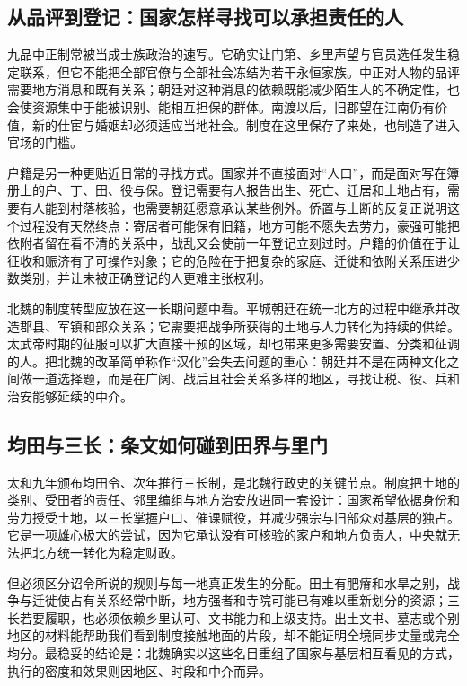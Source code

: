 \subsection{从品评到登记：国家怎样寻找可以承担责任的人}

九品中正制常被当成士族政治的速写。它确实让门第、乡里声望与官员选任发生稳定联系，但它不能把全部官僚与全部社会冻结为若干永恒家族。中正对人物的品评需要地方消息和既有关系；朝廷对这种消息的依赖既能减少陌生人的不确定性，也会使资源集中于能被识别、能相互担保的群体。南渡以后，旧郡望在江南仍有价值，新的仕宦与婚姻却必须适应当地社会。制度在这里保存了来处，也制造了进入官场的门槛。

户籍是另一种更贴近日常的寻找方式。国家并不直接面对“人口”，而是面对写在簿册上的户、丁、田、役与保。登记需要有人报告出生、死亡、迁居和土地占有，需要有人能到村落核验，也需要朝廷愿意承认某些例外。侨置与土断的反复正说明这个过程没有天然终点：寄居者可能保有旧籍，地方可能不愿失去劳力，豪强可能把依附者留在看不清的关系中，战乱又会使前一年登记立刻过时。户籍的价值在于让征收和赈济有了可操作对象；它的危险在于把复杂的家庭、迁徙和依附关系压进少数类别，并让未被正确登记的人更难主张权利。

北魏的制度转型应放在这一长期问题中看。平城朝廷在统一北方的过程中继承并改造郡县、军镇和部众关系；它需要把战争所获得的土地与人力转化为持续的供给。太武帝时期的征服可以扩大直接干预的区域，却也带来更多需要安置、分类和征调的人。把北魏的改革简单称作“汉化”会失去问题的重心：朝廷并不是在两种文化之间做一道选择题，而是在广阔、战后且社会关系多样的地区，寻找让税、役、兵和治安能够延续的中介。

\subsection{均田与三长：条文如何碰到田界与里门}

太和九年颁布均田令、次年推行三长制，是北魏行政史的关键节点。制度把土地的类别、受田者的责任、邻里编组与地方治安放进同一套设计：国家希望依据身份和劳力授受土地，以三长掌握户口、催课赋役，并减少强宗与旧部众对基层的独占。它是一项雄心极大的尝试，因为它承认没有可核验的家户和地方负责人，中央就无法把北方统一转化为稳定财政。

但必须区分诏令所说的规则与每一地真正发生的分配。田土有肥瘠和水旱之别，战争与迁徙使占有关系经常中断，地方强者和寺院可能已有难以重新划分的资源；三长若要履职，也必须依赖乡里认可、文书能力和上级支持。出土文书、墓志或个别地区的材料能帮助我们看到制度接触地面的片段，却不能证明全境同步丈量或完全均分。最稳妥的结论是：北魏确实以这些名目重组了国家与基层相互看见的方式，执行的密度和效果则因地区、时段和中介而异。

